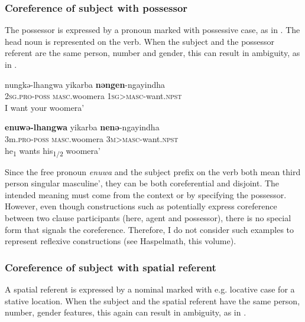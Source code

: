 \documentclass[output=paper]{langscibook}
\begin{document}
\subsubsection{Coreference of subject with possessor}\label{sec:vanegmond:3.2.3}



The possessor is expressed by a pronoun marked with possessive case, as in . The head noun is represented on the verb. When the subject and the possessor referent are the same person, number and gender, this can result in ambiguity, as in .



\ea%
 \label{ex:vanegmond:28}
\gll nungkə-lhangwa yikarba \textbf{ \textbf{nəngen}}-ngayindha\\
\textsc{2sg}.\textsc{pro}-\textsc{poss} \textsc{masc}.woomera \textsc{1sg}>\textsc{masc}-want.\textsc{npst}\\
\glt I want your woomera’
\z



\ea%
 \label{ex:vanegmond:29}
\gll \textbf{enuwə-lhangwa} {yikarba} \textbf{nenə}-ngayindha\\
3m.\textsc{pro}-\textsc{poss} \textsc{masc}.woomera \textsc{3m}>\textsc{masc}-want.\textsc{npst}\\
\glt he\textsubscript{1} wants his\textsubscript{1/2} woomera’
\z



Since the free pronoun \textit{enuwa} and the subject prefix on the verb both mean third person singular masculine’, they can be both coreferential and disjoint. The intended meaning must come from the context or by specifying the possessor. However, even though constructions such as  potentially express coreference between two clause participants (here, agent and possessor), there is no special form that signals the coreference. Therefore, I do not consider such examples to represent reflexive constructions (see Haspelmath, this volume).



\subsubsection{Coreference of subject with spatial referent}\label{sec:vanegmond:3.2.4}

A spatial referent is expressed by a nominal marked with e.g. locative case for a stative location. When the subject and the spatial referent have the same person, number, gender features, this again can result in ambiguity, as in .
\end{document}
